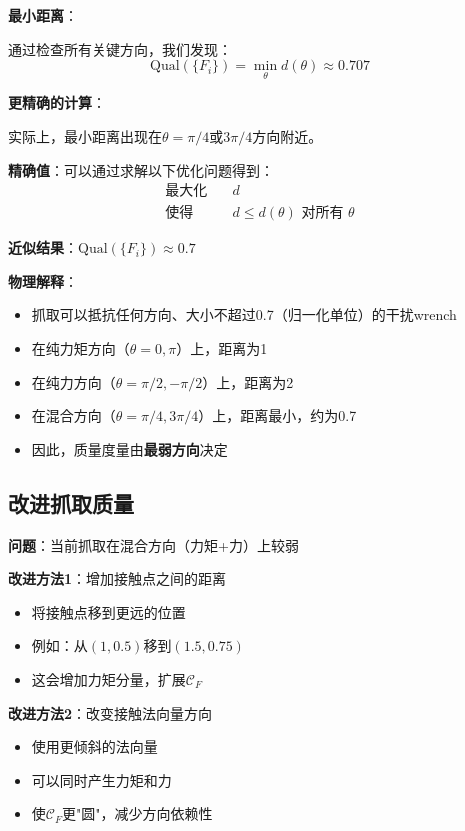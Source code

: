 \documentclass[12pt,a4paper]{article}
\begin{document}
\textbf{最小距离}：

通过检查所有关键方向，我们发现：
\begin{equation}
\text{Qual}(\{F_i\}) = \min_{\theta} d(\theta) \approx 0.707
\end{equation}

\textbf{更精确的计算}：

实际上，最小距离出现在$\theta = \pi/4$或$3\pi/4$方向附近。

\textbf{精确值}：可以通过求解以下优化问题得到：
\begin{align}
\text{最大化} \quad & d \\
\text{使得} \quad & d \leq d(\theta) \text{ 对所有 } \theta
\end{align}

\textbf{近似结果}：$\text{Qual}(\{F_i\}) \approx 0.7$

\textbf{物理解释}：
\begin{itemize}
\item 抓取可以抵抗任何方向、大小不超过0.7（归一化单位）的干扰wrench
\item 在纯力矩方向（$\theta = 0, \pi$）上，距离为1
\item 在纯力方向（$\theta = \pi/2, -\pi/2$）上，距离为2
\item 在混合方向（$\theta = \pi/4, 3\pi/4$）上，距离最小，约为0.7
\item 因此，质量度量由\textbf{最弱方向}决定
\end{itemize}

\subsection{改进抓取质量}

\textbf{问题}：当前抓取在混合方向（力矩+力）上较弱

\textbf{改进方法1}：增加接触点之间的距离
\begin{itemize}
\item 将接触点移到更远的位置
\item 例如：从$(1, 0.5)$移到$(1.5, 0.75)$
\item 这会增加力矩分量，扩展$\mathcal{C}_F$
\end{itemize}

\textbf{改进方法2}：改变接触法向量方向
\begin{itemize}
\item 使用更倾斜的法向量
\item 可以同时产生力矩和力
\item 使$\mathcal{C}_F$更"圆"，减少方向依赖性
\end{itemize}
\end{document}
